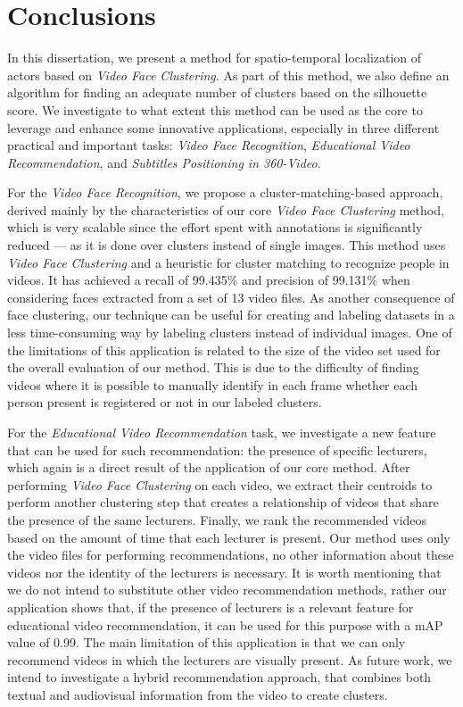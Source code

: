 \newpage

\chapter{Conclusions}
\label{chap:conclusions}

In this dissertation, we present a method for spatio-temporal localization of actors based on \emph{Video Face Clustering}. As part of this method, we also define an algorithm for finding an adequate number of clusters based on the silhouette score. We investigate to what extent this method can be used as the core to leverage and enhance some innovative applications, especially in three different practical and important tasks: \emph{Video Face Recognition}, \emph{Educational Video Recommendation}, and \emph{Subtitles Positioning in 360-Video}.

For the \emph{Video Face Recognition}, we propose a cluster-matching-based approach, derived mainly by the characteristics of our core \emph{Video Face Clustering} method, which is very scalable since the effort spent with annotations is significantly reduced --- as it is done over clusters instead of single images. This method uses \emph{Video Face Clustering} and a heuristic for cluster matching to recognize people in videos. It has achieved a recall of 99.435\% and precision of 99.131\% when considering faces extracted from a set of 13 video files. As another consequence of face clustering, our technique can be useful for creating and labeling datasets in a less time-consuming way by labeling clusters instead of individual images. One of the limitations of this application is related to the size of the video set used for the overall evaluation of our method. This is due to the difficulty of finding videos where it is possible to manually identify in each frame whether each person present is registered or not in our labeled clusters.

For the \emph{Educational Video Recommendation} task, we investigate a new feature that can be used for such recommendation: the presence of specific lecturers, which again is a direct result of the application of our core method. After performing \emph{Video Face Clustering} on each video, we extract their centroids to perform another clustering step that creates a relationship of videos that share the presence of the same lecturers. Finally, we rank the recommended videos based on the amount of time that each lecturer is present. Our method uses only the video files for performing recommendations, no other information about these videos nor the identity of the lecturers is necessary. It is worth mentioning that we do not intend to substitute other video recommendation methods, rather our application shows that, if the presence of lecturers is a relevant feature for educational video recommendation, it can be used for this purpose with a mAP value of 0.99. The main limitation of this application is that we can only recommend videos in which the lecturers are visually present. As future work, we intend to investigate a hybrid recommendation approach, that combines both textual and audiovisual information from the video to create clusters.


